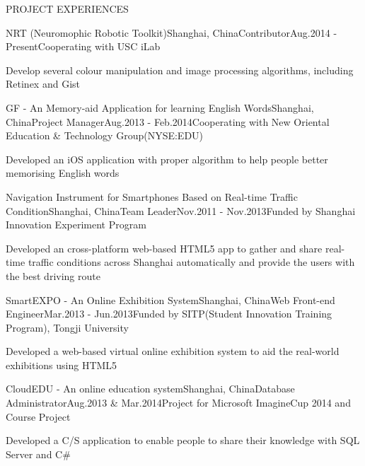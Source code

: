 \documentclass{resume} %
\begin{document}
\begin{rSection}{PROJECT EXPERIENCES}

  \begin{pSubsection}{NRT (Neuromophic Robotic Toolkit)}{Shanghai, China}{Contributor}{Aug.2014 - Present}{Cooperating
    with USC iLab}
  \item Develop several colour manipulation and image processing algorithms, including Retinex and Gist
  \end{pSubsection}

  \begin{pSubsection}{GF - An Memory-aid Application for learning English Words}{Shanghai,
    China}{Project Manager}{Aug.2013 - Feb.2014}{Cooperating with New Oriental Education \& Technology Group(NYSE:EDU) }
  \item Developed an iOS application with proper algorithm to help people better memorising English words
  \end{pSubsection}

  \begin{pSubsection}{Navigation Instrument for Smartphones Based on Real-time Traffic Condition}{Shanghai,
    China}{Team Leader}{Nov.2011 - Nov.2013}{Funded by Shanghai Innovation Experiment Program}
  \item Developed an cross-platform web-based HTML5 app to gather and share real-time traffic conditions across
    Shanghai automatically and provide the users with the best driving route
  \end{pSubsection}

  \begin{pSubsection}{SmartEXPO - An Online Exhibition System}{Shanghai,
    China}{Web Front-end Engineer}{Mar.2013 - Jun.2013}{Funded by SITP(Student Innovation Training Program), Tongji University}
  \item Developed a web-based virtual online exhibition system to aid the real-world exhibitions using HTML5
  \end{pSubsection}

  \begin{pSubsection}{CloudEDU - An online education system}{Shanghai,
  China}{Database Administrator}{Aug.2013 \& Mar.2014}{Project for Microsoft ImagineCup 2014 and Course Project}
  \item Developed a C/S application to enable people to share their knowledge with SQL Server and C\#
  \end{pSubsection}

\end{rSection}
\end{document}
